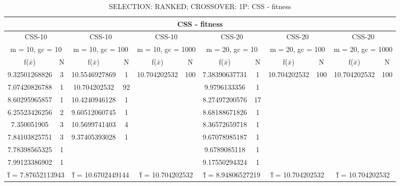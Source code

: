 \begin{table}[H]
	\centering
	\caption{SELECTION: RANKED; CROSSOVER: 1P: CSS - fitness}
	\begin{adjustbox}{width=1\textwidth}
		\begin{tabular}{ |c|c||c|c||c|c||c|c||c|c||c|c| }
			\hline
			\multicolumn{12}{|c|}{CSS - fitness} \\
			\hline
			\multicolumn{2}{|c||}{CSS-10} & \multicolumn{2}{c||}{CSS-10} & \multicolumn{2}{c||}{CSS-10} & \multicolumn{2}{c||}{CSS-20} & \multicolumn{2}{c||}{CSS-20} & \multicolumn{2}{c|}{CSS-20}\\
			\hline
			\multicolumn{2}{|c||}{m = 10, gc = 10} & \multicolumn{2}{c||}{m = 10, gc = 100} & \multicolumn{2}{c||}{m = 10, gc = 1000} & \multicolumn{2}{c||}{m = 20, gc = 10} & \multicolumn{2}{c||}{m = 20, gc = 100} & \multicolumn{2}{c|}{m = 20, gc = 1000}\\
			\hline
			f($\bar{x}$) & N & f($\bar{x}$) & N & f($\bar{x}$) & N & f($\bar{x}$) & N & f($\bar{x}$) & N & f($\bar{x}$) & N\\
			\hline
			\hline
			9.32501268826 & 3 & 10.5546927869 & 1 & 10.704202532 & 100 & 7.38390637731 & 1 & 10.704202532 & 100 & 10.704202532 & 100\\
			7.07420826788 & 1 & 10.704202532 & 92 &   &   & 9.9796133356 & 1 &   &   &   &  \\
			8.60295965857 & 1 & 10.4240946128 & 1 &   &   & 8.27497200576 & 17 &   &   &   &  \\
			6.25523426256 & 2 & 9.60512060745 & 1 &   &   & 8.68188671826 & 1 &   &   &   &  \\
			7.350051905 & 3 & 10.5699741403 & 4 &   &   & 8.36572659718 & 1 &   &   &   &  \\
			7.84103825751 & 3 & 9.37405393028 & 1 &   &   & 9.67078985187 & 1 &   &   &   &  \\
			7.78398565325 & 1 &   &   &   &   & 9.6789085118 & 1 &   &   &   &  \\
			7.99123386902 & 1 &   &   &   &   & 9.17550294324 & 1 &   &   &   &  \\
			\hline
			\multicolumn{2}{|c||}{\^{f} = 7.87652113943} & \multicolumn{2}{c||}{\^{f} = 10.6702449144} & \multicolumn{2}{c||}{\^{f} = 10.704202532} & \multicolumn{2}{c||}{\^{f} = 8.94806527219} & \multicolumn{2}{c||}{\^{f} = 10.704202532} & \multicolumn{2}{c|}{\^{f} = 10.704202532}\\
			\hline
		\end{tabular}
	\end{adjustbox}
\end{table}
